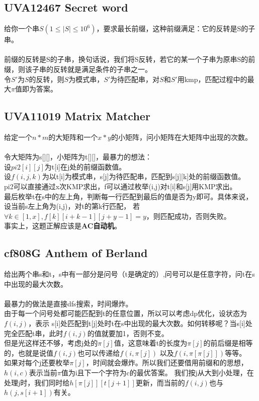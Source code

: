     \subsection{UVA12467 Secret word}
        给你一个串$S(1 \le |S| \le 10^6)$，要求最长前缀，这种前缀满足：它的反转是S的子串。\\\\
        前缀的反转是S的子串，换句话说，我们将S反转，若它的某一个子串为原串S的前缀，则该子串的反转就是满足条件的子串之一。\\
        令$S'$为$S$的反转，则$S$为模式串，$S'$为待匹配串，对$S$和$S'$用kmp，匹配过程中的最大$\pi$值即为答案。
    \subsection{UVA11019 Matrix Matcher}
        给定一个$n*m$的大矩阵和一个$x*y$的小矩阵，问小矩阵在大矩阵中出现的次数。\\\\
        令大矩阵为s[][]，小矩阵为t[][]，最暴力的想法：\\
        设$pi2[i][j]$为t[i]在j处的前缀函数值。\\
        设$f(i,j,k)$为以t[i]为模式串，s[j]为待匹配串，匹配到s[j][k]处的前缀函数值。\\
        pi2可以直接通过x次KMP求出，f可以通过枚举(i,j)对t[i]和s[j]用KMP求出。\\
        最后枚举t在s中的左上角，判断每一行匹配到最后的值是否为y即可。具体来说，设当前s左上角为(i,j)，对t的第k行匹配，
        若$\forall k \in [1,x], f[k][i + k - 1][j + y - 1] = y$，则匹配成功，否则失败。\\
        事实上，这题正解应该是\textbf{AC自动机}。
    \subsection{cf808G Anthem of Berland}
        给出两个串s和t，s中有一部分是问号（t是确定的）,问号可以是任意字符，问t在s中出现的最大次数。\\\\
        最暴力的做法是直接dfs搜索，时间爆炸。\\
        由于每一个问号处都可能匹配到t的任意位置，所以可以考虑dp优化，设状态为$f(i,j)$，表示
        s[i]处匹配到t[j]处时t在s中出现的最大次数。如何转移呢？当s[i]处完全匹配t串，此时$f(i,j)$的值就要加1，否则不变。\\
        但是光这样还不够，考虑j处的$\pi[j]$值，这意味着t的长度为$\pi[j]$的前后缀是相等的，也就是说值$f(i,j)$也可以传递给$f(i,\pi[j])$
        以及$f(i,\pi[\pi[j]])$等等。\\
        如果对每个j还要枚举$\pi[j]$，时间就会爆炸。所以我们还要借用前缀和的思想，$h(i,c)$表示当前$\pi$值为i且下一个字符为c的最优答案。
        我们按j从大到小处理，在处理j时，我们同时给$h[\pi[j]][t[j+1]]$更新，而当前的$f(i,j)$也与$h(j,s[i+1])$有关。